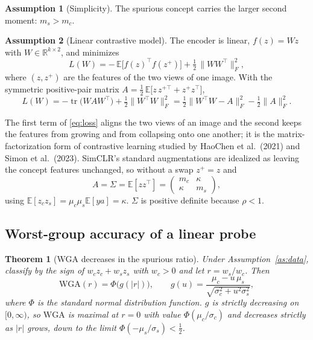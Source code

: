 \documentclass[11pt]{article}
\newtheorem{theorem}{Theorem}
\theoremstyle{definition}
\newtheorem{assumption}{Assumption}
\theoremstyle{remark}
\newcommand{\E}{\mathbb{E}}
\newcommand{\R}{\mathbb{R}}
\newcommand{\wga}{\mathrm{WGA}}
\begin{document}
\begin{assumption}[Simplicity]\label{as:simple}
The spurious concept carries the larger second moment: $m_s>m_c$.
\end{assumption}

\begin{assumption}[Linear contrastive model]\label{as:lin}
The encoder is linear, $f(z)=Wz$ with $W\in\R^{k\times2}$, and minimizes
\begin{equation}\label{eq:loss}
L(W)=-\,\E\big[f(z)^\top f(z^+)\big]+\tfrac12\,\big\|WW^\top\big\|_F^2 ,
\end{equation}
where $(z,z^+)$ are the features of the two views of one image. With the symmetric positive-pair matrix
$A=\tfrac12\,\E\big[z\,z^{+\top}+z^{+}z^\top\big]$,
\[
L(W)=-\operatorname{tr}\big(WAW^\top\big)+\tfrac12\big\|W^\top W\big\|_F^2
=\tfrac12\big\|W^\top W-A\big\|_F^2-\tfrac12\|A\|_F^2 .
\]
\end{assumption}

The first term of \eqref{eq:loss} aligns the two views of an image and the second keeps the features from growing
and from collapsing onto one another; it is the matrix-factorization form of contrastive learning studied by HaoChen
et al.\ (2021) and Simon et al.\ (2023). SimCLR's standard augmentations are idealized as leaving the concept features
unchanged, so without a swap $z^+=z$ and
\begin{equation}\label{eq:A}
A=\Sigma=\E[zz^\top]=\begin{pmatrix}m_c&\kappa\\ \kappa&m_s\end{pmatrix},
\end{equation}
using $\E[z_cz_s]=\mu_c\mu_s\E[ya]=\kappa$. $\Sigma$ is positive definite because $\rho<1$.

\subsection{Worst-group accuracy of a linear probe}

\begin{theorem}[WGA decreases in the spurious ratio]\label{thm:wga}
Under Assumption~\ref{as:data}, classify by the sign of $w_cz_c+w_sz_s$ with $w_c>0$ and let $r=w_s/w_c$. Then
\[
\wga(r)=\Phi\big(g(|r|)\big),\qquad g(u)=\frac{\mu_c-u\,\mu_s}{\sqrt{\sigma_c^2+u^2\sigma_s^2}},
\]
where $\Phi$ is the standard normal distribution function. $g$ is strictly decreasing on $[0,\infty)$, so $\wga$ is
maximal at $r=0$ with value $\Phi(\mu_c/\sigma_c)$ and decreases strictly as $|r|$ grows, down to the limit
$\Phi(-\mu_s/\sigma_s)<\tfrac12$.
\end{theorem}
\end{document}
